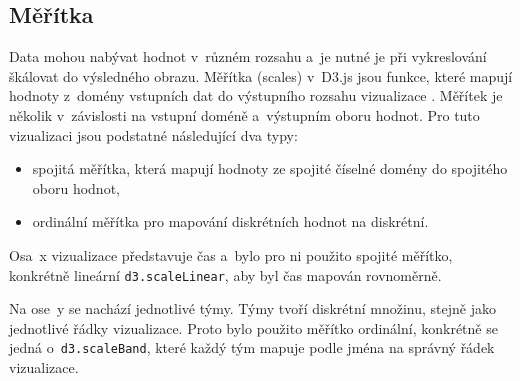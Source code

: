 \documentclass[
  digital, %
  oneside, %
  table,   %
  nolof,     %
  nolot,     %
  nocover
]{fithesis3}
\begin{document}
\subsection{Měřítka}
Data mohou nabývat hodnot v~různém rozsahu a~je nutné je při vykreslování škálovat do výsledného obrazu. Měřítka (scales) v~D3.js jsou funkce, které mapují hodnoty z~domény vstupních dat do výstupního rozsahu vizualizace \cite{d3jsorg}. Měřítek je několik v~závislosti na vstupní doméně a~výstupním oboru hodnot. Pro tuto vizualizaci jsou podstatné následující dva typy:
\begin{itemize}
  \item spojitá měřítka, která mapují hodnoty ze spojité číselné domény do spojitého oboru hodnot,
  \item ordinální měřítka pro mapování diskrétních hodnot na diskrétní.
\end{itemize}
Osa~x vizualizace představuje čas a~bylo pro ni použito spojité měřítko, konkrétně lineární \verb|d3.scaleLinear|, aby byl čas mapován rovnoměrně.\par
Na ose~y se nachází jednotlivé týmy. Týmy tvoří diskrétní množinu, stejně jako jednotlivé řádky vizualizace. Proto bylo použito měřítko ordinální, konkrétně se jedná o~\verb|d3.scaleBand|, které každý tým mapuje podle jména na správný řádek vizualizace.

\end{document}
